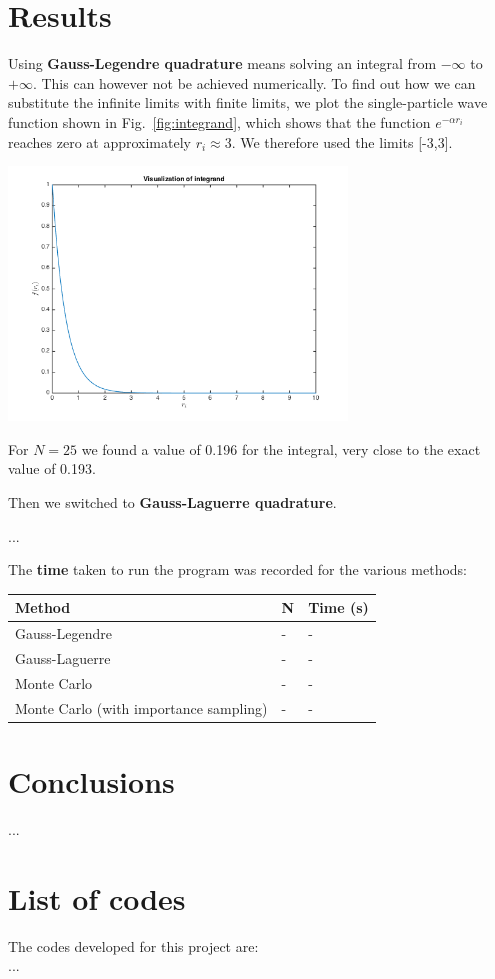 \documentclass{article}
\begin{document}
\begin{multicols}{2}
\section{Results}

Using \textbf{Gauss-Legendre quadrature} means solving an integral from $- \infty$ to $+ \infty$. This can however not be achieved numerically. To find out how we can substitute the infinite limits with finite limits, we plot the single-particle wave function shown in Fig.~\ref{fig:integrand}, which shows that the function $e^{-\alpha r_i}$ reaches zero at approximately $r_i \approx 3$. We therefore used the limits [-3,3].

\begin{center}
	\includegraphics[width=90mm]{integrand.png} 	
	\label{fig:integrand}
\end{center}
For $N = 25$ we found a value of 0.196 for the integral, very close to the exact value of 0.193. 

Then we switched to \textbf{Gauss-Laguerre quadrature}.

...

The \textbf{time} taken to run the program was recorded for the various methods:

\begin{center}
\begin{tabular}{ l l l}\hline
	Method 								& N	 		& Time (s) \\ \hline
	Gauss-Legendre 						& - 			& - \\
	Gauss-Laguerre 						& -			& - \\
	Monte Carlo 							& - 			& - \\
	Monte Carlo (with importance sampling) 		& - 			& - \\
	\hline
\end{tabular}
\end{center}



\section{Conclusions}
...





\section{List of codes}

The codes developed for this project are:\\
...

\end{multicols}
\end{document}
